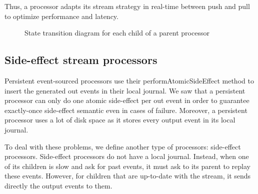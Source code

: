 Thus, a processor adapts its stream strategy in real-time between push and pull to optimize performance and latency.

\begin{figure}[h]
  \begin{center} 
    \caption{State transition diagram for each child of a parent processor}
    \label{fig:childstates}
  \end{center}
\end{figure}

\subsection{Side-effect stream processors}
\label{sec:sideeffectproc}

Persistent event-sourced processors use their performAtomicSideEffect method to insert the generated out events in their local journal. We saw that a persistent processor can only do one
atomic side-effect per out event in order to guarantee exactly-once side-effect semantic even in cases of failure. Moreover, a persistent processor uses a lot of disk space as it stores
every output event in its local journal.

To deal with these problems, we define another type of processors: side-effect processors. Side-effect processors do not have a local journal. Instead, when one of its children is slow
and ask for past events, it must ask to its parent to replay these events. However, for children that are up-to-date with the stream, it sends directly the output events to them.

